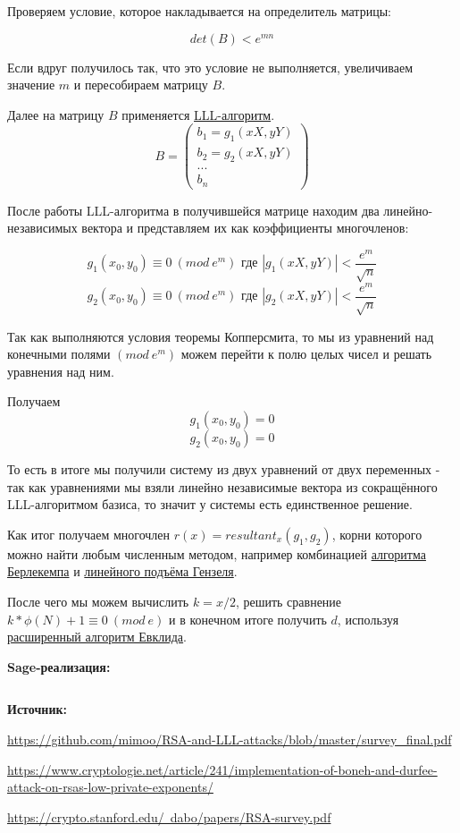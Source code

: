 \documentclass[12pt,a4paper]{scrartcl}
\begin{document}
Проверяем условие, которое накладывается на определитель матрицы:

$$det(B)<e^{mn}$$

Если вдруг получилось так, что это условие не выполняется, увеличиваем значение $m$ и пересобираем матрицу $B$.

Далее на матрицу $B$ применяется \href{https://yatb.kksctf.ru/}{LLL-алгоритм}.\\

$$B = \begin{pmatrix}
	b_1=g_1(xX,yY)\\
	b_2=g_2(xX,yY)\\
	...\\
	b_n
\end{pmatrix}$$

После работы LLL-алгоритма в получившейся матрице находим два линейно-независимых вектора и представляем их как коэффициенты многочленов:

$$g_1(x_0,y_0)\equiv 0\ (mod\ e^m)\text{ где } |g_1(xX,yY)|<\dfrac{e^m}{\sqrt{n}}$$
$$g_2(x_0,y_0)\equiv 0\ (mod\ e^m)\text{ где } |g_2(xX,yY)|<\dfrac{e^m}{\sqrt{n}}$$

Так как выполняются условия теоремы Копперсмита, то мы из уравнений над конечными полями $(mod\ e^m)$ можем перейти к полю целых чисел и решать уравнения над ним.

Получаем
$$g_1(x_0,y_0) = 0$$
$$g_2(x_0,y_0) = 0$$

То есть в итоге мы получили систему из двух уравнений от двух переменных - так как уравнениями мы взяли линейно независимые вектора из сокращённого LLL-алгоритмом базиса, то значит у системы есть единственное решение.

Как итог получаем многочлен $r(x)=resultant_x(g_1,g_2)$, корни которого можно найти любым численным методом, например комбинацией \href{https://yatb.kksctf.ru/}{алгоритма Берлекемпа} и \href{https://yatb.kksctf.ru/}{линейного подъёма Гензеля}.

После чего мы можем вычислить $k = x/2$, решить сравнение $k*\phi(N)+1\equiv 0\ (mod\ e)$ и в конечном итоге получить $d$, используя \href{https://yatb.kksctf.ru/}{расширенный алгоритм Евклида}.

\textbf{Sage-реализация:}\\

\inputminted[tabsize=4,obeytabs,fontsize=\footnotesize]{python3}{./RSA_scripts/boneh_Durfee.sage}

\textbf{Источник:}

\href{https://github.com/mimoo/RSA-and-LLL-attacks/blob/master/survey_final.pdf}{https://github.com/mimoo/RSA-and-LLL-attacks/blob/master/survey\_final.pdf}

\href{https://www.cryptologie.net/article/241/implementation-of-boneh-and-durfee-attack-on-rsas-low-private-exponents/}{https://www.cryptologie.net/article/241/implementation-of-boneh-and-durfee-attack-on-rsas-low-private-exponents/}

\href{https://crypto.stanford.edu/~dabo/papers/RSA-survey.pdf}{https://crypto.stanford.edu/~dabo/papers/RSA-survey.pdf}
\end{document}
